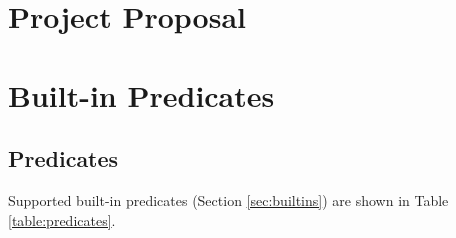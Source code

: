 \begin{appendices}

\chapter{Project Proposal}

\label{appendix:proposal}



\chapter{Built-in Predicates}

\label{appendix:predicates}

\section{Predicates}

Supported built-in predicates (Section \ref{sec:builtins}) are shown in Table \ref{table:predicates}.


\end{appendices}
